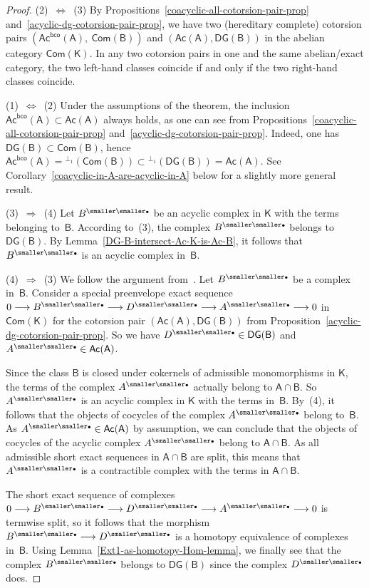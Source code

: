 \documentclass[12pt,a4paper]{amsart}
\newcommand{\+}{\nobreakdash-}
\renewcommand{\:}{\colon}
\newcommand{\rarrow}{\longrightarrow}
\newcommand{\bu}{{\text{\smaller\smaller$\scriptstyle\bullet$}}}
\newcommand{\sA}{\mathsf A}
\newcommand{\sB}{\mathsf B}
\newcommand{\sK}{\mathsf K}
\newcommand{\Com}{\mathsf{Com}}
\newcommand{\Ac}{\mathsf{Ac}}
\newcommand{\DG}{\mathsf{DG}}
\newcommand{\bco}{\mathsf{bco}}
\theoremstyle{plain}
\theoremstyle{definition}
\begin{document}
\begin{proof}
 (2)~$\Longleftrightarrow$~(3)
 By Propositions~\ref{coacyclic-all-cotorsion-pair-prop}
and~\ref{acyclic-dg-cotorsion-pair-prop}, we have two (hereditary
complete) cotorsion pairs $(\Ac^\bco(\sA),\>\Com(\sB))$ and
$(\Ac(\sA),\DG(\sB))$ in the abelian category $\Com(\sK)$.
 In any two cotorsion pairs in one and the same abelian/exact category,
the two left-hand classes coincide if and only if the two right-hand
classes coincide.

 (1)~$\Longleftrightarrow$~(2)
 Under the assumptions of the theorem, the inclusion
$\Ac^\bco(\sA)\subset\Ac(\sA)$ always holds, as one can see from
Propositions~\ref{coacyclic-all-cotorsion-pair-prop}
and~\ref{acyclic-dg-cotorsion-pair-prop}.
 Indeed, one has $\DG(\sB)\subset\Com(\sB)$, hence
$\Ac^\bco(\sA)={}^{\perp_1}(\Com(\sB))\subset{}^{\perp_1}(\DG(\sB))=
\Ac(\sA)$.
 See Corollary~\ref{coacyclic-in-A-are-acyclic-in-A} below for
a slightly more general result.

 (3)~$\Longrightarrow$~(4)
 Let $B^\bu$ be an acyclic complex in $\sK$ with the terms belonging
to~$\sB$.
 According to~(3), the complex $B^\bu$ belongs to~$\DG(\sB)$.
 By Lemma~\ref{DG-B-intersect-Ac-K-is-Ac-B}, it follows that $B^\bu$
is an acyclic complex in~$\sB$.

 (4)~$\Longrightarrow$~(3)
 We follow the argument from~\cite[Theorem~5.3]{BCE}.
 Let $B^\bu$ be a complex in~$\sB$.
 Consider a special preenvelope exact sequence $0\rarrow B^\bu\rarrow
D^\bu\rarrow A^\bu\rarrow0$ in $\Com(\sK)$ for the cotorsion pair
$(\Ac(\sA),\DG(\sB))$ from
Proposition~\ref{acyclic-dg-cotorsion-pair-prop}.
 So we have $D^\bu\in\DG(\sB)$ and $A^\bu\in\Ac(\sA)$.

 Since the class $\sB$ is closed under cokernels of admissible
monomorphisms in $\sK$, the terms of the complex $A^\bu$ actually
belong to $\sA\cap\sB$.
 So $A^\bu$ is an acyclic complex in $\sK$ with the terms in~$\sB$.
 By~(4), it follows that the objects of cocycles of the complex $A^\bu$
belong to~$\sB$.
 As $A^\bu\in\Ac(\sA)$ by assumption, we can conclude that the objects
of cocycles of the acyclic complex $A^\bu$ belong to $\sA\cap\sB$.
 As all admissible short exact sequences in $\sA\cap\sB$ are split,
this means that $A^\bu$ is a contractible complex with the terms
in $\sA\cap\sB$.

 The short exact sequence of complexes $0\rarrow B^\bu\rarrow D^\bu
\rarrow A^\bu\rarrow0$ is termwise split, so it follows that
the morphism $B^\bu\rarrow D^\bu$ is a homotopy equivalence of
complexes in~$\sB$.
 Using Lemma~\ref{Ext1-as-homotopy-Hom-lemma}, we finally see that
the complex $B^\bu$ belongs to $\DG(\sB)$ since the complex $D^\bu$
does.
\end{proof}
\end{document}
